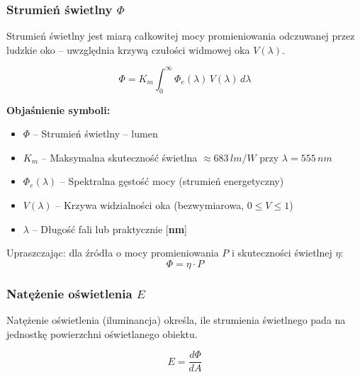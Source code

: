 \documentclass[12pt,a4paper]{article}
\newcommand{\oznaczenie}[2]{%
  \item $#1$ -- #2%
}
\begin{document}
\subsubsection{Strumień świetlny $\Phi$}

Strumień świetlny jest miarą całkowitej mocy promieniowania odczuwanej
przez ludzkie oko -- uwzględnia krzywą czułości widmowej oka $V(\lambda)$.

\begin{wzorbox}
\begin{equation}
  \Phi = K_m \int_{0}^{\infty} \Phi_e(\lambda)\, V(\lambda)\, d\lambda
  \label{eq:strumien}
\end{equation}
\end{wzorbox}

\begin{objasnbox}
\textbf{Objaśnienie symboli:}
\begin{itemize}[leftmargin=2em]
  \oznaczenie{\Phi}{Strumień świetlny \quad [\textbf{lm}] -- lumen}
  \oznaczenie{K_m}{Maksymalna skuteczność świetlna $\approx 683\,\si{lm/W}$ przy
                   $\lambda = 555\,\si{nm}$}
  \oznaczenie{\Phi_e(\lambda)}{Spektralna gęstość mocy (strumień energetyczny)
                   \quad [\textbf{W/nm}]}
  \oznaczenie{V(\lambda)}{Krzywa widzialności oka (bezwymiarowa, $0\leq V \leq 1$)}
  \oznaczenie{\lambda}{Długość fali \quad [\textbf{m}] lub praktycznie [\textbf{nm}]}
\end{itemize}
\end{objasnbox}

Upraszczając: dla źródła o mocy promieniowania $P$ i skuteczności świetlnej $\eta$:
\begin{equation}
  \Phi = \eta \cdot P
\end{equation}

\subsubsection{Natężenie oświetlenia $E$}

Natężenie oświetlenia (iluminancja) określa, ile strumienia świetlnego
pada na jednostkę powierzchni oświetlanego obiektu.

\begin{wzorbox}
\begin{equation}
  E = \frac{d\Phi}{dA}
  \label{eq:natezenie}
\end{equation}
\end{wzorbox}
\end{document}
